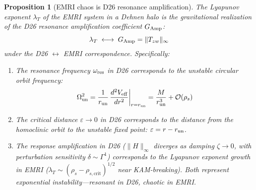 \documentclass[
]{article}
\newtheorem{proposition}[theorem]{Proposition}
\begin{document}
\begin{proposition}[EMRI chaos is D26 resonance amplification]\label{prop:emri-chaos-resonance}
The Lyapunov exponent $\lambda_T$ of the EMRI system in a Dehnen halo is the gravitational realization of the D26 resonance amplification coefficient $G_{\rm Amp}$:
\begin{equation}
\lambda_T \;\longleftrightarrow\; G_{\rm Amp} = \|T_{zw}\|_\infty
\end{equation}
under the D26 $\leftrightarrow$ EMRI correspondence. Specifically:
\begin{enumerate}
\item The resonance frequency $\omega_{\rm res}$ in D26 corresponds to the unstable circular orbit frequency:
\begin{equation}\label{eq:omega_un}
\Omega_{\rm un}^2 = \frac{1}{r_{\rm un}}\,\frac{d^2 V_{\rm eff}}{dr^2}\bigg|_{r=r_{\rm un}} = \frac{M}{r_{\rm un}^3} + \mathcal{O}(\rho_s)
\end{equation}
\item The critical distance $\varepsilon \to 0$ in D26 corresponds to the distance from the homoclinic orbit to the unstable fixed point: $\varepsilon = r - r_{\rm un}$.
\item The response amplification in D26 ($\|H\|_\infty$ diverges as damping $\zeta \to 0$, with perturbation sensitivity $\delta \sim \Gamma^1$) corresponds to the Lyapunov exponent growth in EMRI ($\lambda_T \sim (\rho_s - \rho_{s,\text{crit}})^{1/2}$ near KAM-breaking). Both represent exponential instability---resonant in D26, chaotic in EMRI.
\end{enumerate}
\end{proposition}
\end{document}
